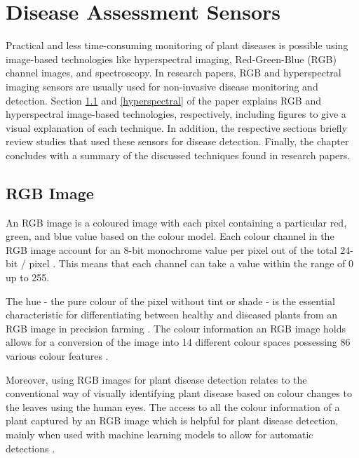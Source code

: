 
\chapter{Disease Assessment Sensors}\label{cha:acessDisease} 
Practical and less time-consuming monitoring of plant diseases is possible using image-based technologies like hyperspectral imaging, Red-Green-Blue (RGB) channel images, and spectroscopy. 
In research papers, RGB and hyperspectral imaging sensors are usually used for non-invasive disease monitoring and detection. Section \ref{rgb} and \ref{hyperspectral} of the paper explains RGB and hyperspectral image-based technologies, respectively, including figures to give a visual explanation of each technique. In addition, the respective sections briefly review studies that used these sensors for disease detection. Finally, the chapter concludes with a summary of the discussed techniques found in research papers.

\section{RGB Image}\label{rgb}
An RGB image is a coloured image with each pixel containing a particular red, green, and blue value based on the colour model. Each colour channel in the RGB image account for an 8-bit monochrome value per pixel out of the total 24-bit / pixel \cite{padmavathi2016implementation}. This means that each channel can take a value within the range of 0 up to 255.

The hue - the pure colour of the pixel without tint or shade - is the essential characteristic for differentiating between healthy and diseased plants from an RGB image in precision farming \cite{bock2010plant}. The colour information an RGB image holds allows for a conversion of the image into 14 different colour spaces possessing 86 various colour features \cite{shrivastava2015exploring}.

Moreover, using RGB images for plant disease detection relates to the conventional way of visually identifying plant disease based on colour changes to the leaves using the human eyes. The access to all the colour information of a plant captured by an RGB image 
 which is helpful for plant disease detection, mainly when used with machine learning models to allow for automatic detections \cite{shin2021deep}.
